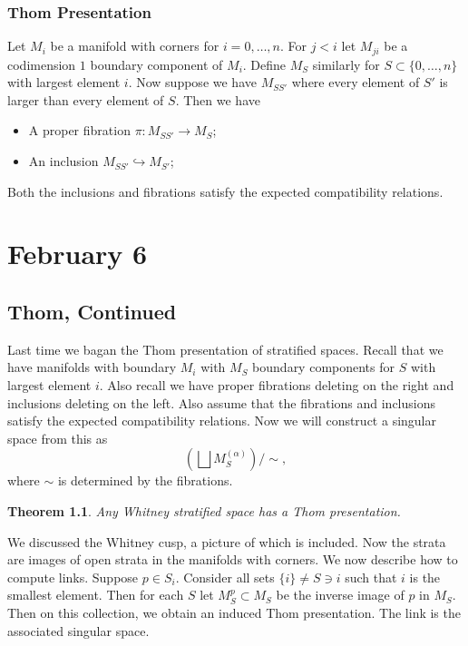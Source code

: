 \documentclass[leqno, openany]{memoir}
\newtheorem{thm}{Theorem}[chapter]
\theoremstyle{definition}
\theoremstyle{remark}
\theoremstyle{plain}
\theoremstyle{definition}
\theoremstyle{remark}
\begin{document}
\subsection{Thom Presentation}%
\label{sub:thom_presentation}

Let $M_i$ be a manifold with corners for $i = 0, \ldots, n$. For $j < i$ let $M_{ji}$ be a codimension $1$ boundary component of $M_i$. Define $M_S$ similarly for $S \subset \{ 0, \ldots, n \}$ with largest element $i$. Now suppose we have $M_{SS'}$ where every element of $S'$ is larger than every element of $S$. Then we have
\begin{itemize}
    \item A proper fibration $\pi: M_{SS'} \to M_S$;
    \item An inclusion $M_{SS'} \hookrightarrow M_{S'}$;
\end{itemize}
Both the inclusions and fibrations satisfy the expected compatibility relations. 

\chapter{February 6}%
\label{cha:february_6}

\section{Thom, Continued}%
\label{sec:thom_continued}

Last time we bagan the Thom presentation of stratified spaces. Recall that we have manifolds with boundary $M_i$ with $M_S$ boundary components for $S$ with largest element $i$. Also recall we have proper fibrations deleting on the right and inclusions deleting on the left. Also assume that the fibrations and inclusions satisfy the expected compatibility relations. Now we will construct a singular space from this as
\[ \left( \bigsqcup M_S^{(\alpha)} \right) \big/ \sim, \]
where $\sim$ is determined by the fibrations.

\begin{thm}
    Any Whitney stratified space has a Thom presentation.
\end{thm}
We discussed the Whitney cusp, a picture of which is included. Now the strata are images of open strata in the manifolds with corners. We now describe how to compute links. Suppose $p \in S_i$. Consider all sets $\{i \} \neq S \ni i$ such that $i$ is the smallest element. Then for each $S$ let $M_S^p \subset M_S$ be the inverse image of $p$ in $M_S$. Then on this collection, we obtain an induced Thom presentation. The link is the associated singular space.
\end{document}
